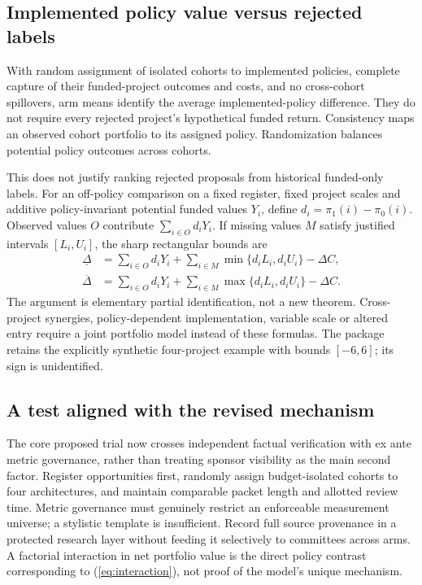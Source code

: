 \documentclass[11pt]{article}
\begin{document}
\subsection{Implemented policy value versus rejected labels}\label{subsec:labels}
With random assignment of isolated cohorts to implemented policies, complete capture of their funded-project outcomes and costs, and no cross-cohort spillovers, arm means identify the average implemented-policy difference. They do not require every rejected project's hypothetical funded return. Consistency maps an observed cohort portfolio to its assigned policy. Randomization balances potential policy outcomes across cohorts.

This does not justify ranking rejected proposals from historical funded-only labels. For an off-policy comparison on a fixed register, fixed project scales and additive policy-invariant potential funded values $Y_i$, define $d_i=\pi_1(i)-\pi_0(i)$. Observed values $O$ contribute $\sum_{i\in O}d_iY_i$. If missing values $M$ satisfy justified intervals $[L_i,U_i]$, the sharp rectangular bounds are
\begin{align}
\underline\Delta&=\sum_{i\in O}d_iY_i+\sum_{i\in M}\min\{d_iL_i,d_iU_i\}-\Delta C,\\
\overline\Delta&=\sum_{i\in O}d_iY_i+\sum_{i\in M}\max\{d_iL_i,d_iU_i\}-\Delta C.\label{eq:bounds}
\end{align}
The argument is elementary partial identification, not a new theorem. Cross-project synergies, policy-dependent implementation, variable scale or altered entry require a joint portfolio model instead of these formulas. The package retains the explicitly synthetic four-project example with bounds $[-6,6]$; its sign is unidentified.
\subsection{A test aligned with the revised mechanism}\label{subsec:design}
The core proposed trial now crosses independent factual verification with ex ante metric governance, rather than treating sponsor visibility as the main second factor. Register opportunities first, randomly assign budget-isolated cohorts to four architectures, and maintain comparable packet length and allotted review time. Metric governance must genuinely restrict an enforceable measurement universe; a stylistic template is insufficient. Record full source provenance in a protected research layer without feeding it selectively to committees across arms. A factorial interaction in net portfolio value is the direct policy contrast corresponding to (\ref{eq:interaction}), not proof of the model's unique mechanism.
\end{document}
